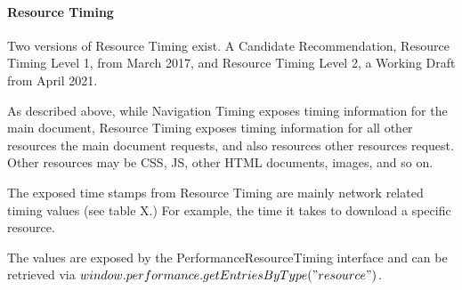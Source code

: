 




\paragraph{Resource Timing}



Two versions of Resource Timing exist.
A Candidate Recommendation, Resource Timing Level 1, from March 2017, %
and Resource Timing Level 2, a Working Draft from April 2021.  %

As described above, while Navigation Timing exposes timing information for the main document, Resource Timing exposes timing information for all other resources the main document requests, and also resources other resources request.
Other resources may be CSS, JS, other HTML documents, images, and so on.

The exposed time stamps from Resource Timing are mainly network related timing values (see table X.)
For example, the time it takes to download a specific resource.



The values are exposed by the PerformanceResourceTiming interface and can be retrieved via $window.performance.getEntriesByType("resource")$.





